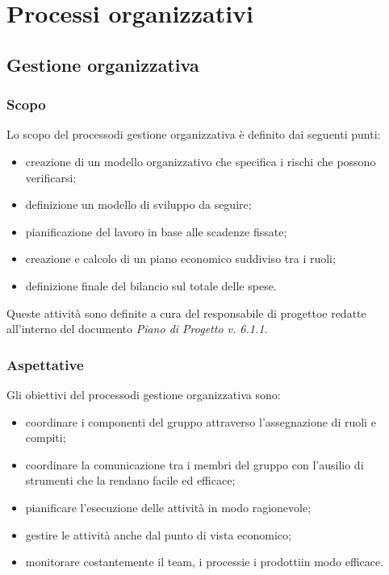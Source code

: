 \section{Processi organizzativi}
	\subsection{Gestione organizzativa}
		\subsubsection{Scopo}
			Lo scopo del processo\glosp di gestione organizzativa è definito dai seguenti punti:
			\begin{itemize}
				\item creazione di un modello organizzativo che specifica i rischi che possono verificarsi;
				\item definizione un modello di sviluppo da seguire;
				\item pianificazione del lavoro in base alle scadenze fissate;
				\item creazione e calcolo di un piano economico suddiviso tra i ruoli;
				\item definizione finale del bilancio sul totale delle spese.
			\end{itemize}
			Queste attività sono definite a cura del responsabile di progetto\glosp e redatte all'interno del documento \textit{Piano di Progetto v. 6.1.1}.
		\subsubsection{Aspettative}
			Gli obiettivi del processo\glosp di gestione organizzativa sono:
			\begin{itemize}
				\item coordinare i componenti del gruppo attraverso l'assegnazione di ruoli e compiti;
				\item coordinare la comunicazione tra i membri del gruppo con l'ausilio di strumenti che la rendano facile ed efficace;
				\item pianificare l'esecuzione delle attività in modo ragionevole;
				\item gestire le attività anche dal punto di vista economico;
				\item monitorare costantemente il team, i processi\glosp e i prodotti\glosp in modo efficace.
			\end{itemize}
